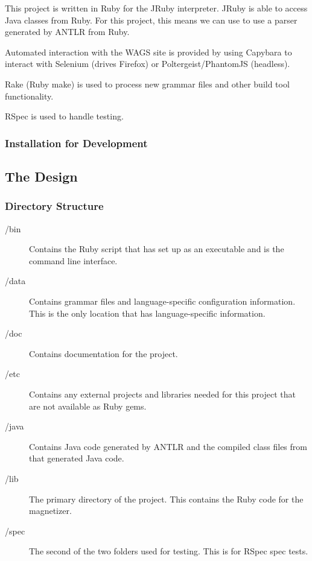 \documentclass[letter,10pt]{article}
\begin{document}

This project is written in Ruby for the JRuby interpreter. JRuby is able
to access Java classes from Ruby. For this project, this means we can 
use to use a parser generated by ANTLR from Ruby.

Automated interaction with the WAGS site is provided by using Capybara 
to interact with Selenium (drives Firefox) or Poltergeist/PhantomJS 
(headless).

Rake (Ruby make) is used to process new grammar files and other build 
tool functionality.

RSpec is used to handle testing.

\subsubsection{Installation for Development}

\subsection{The Design}

\subsubsection{Directory Structure}
\begin{description}
 \item [/bin]
    Contains the Ruby script that has set up as an 
executable and is the command line interface.

 \item [/data]
    Contains grammar files and language-specific 
configuration information. This is the only location that has 
language-specific information.

 \item [/doc]
    Contains documentation for the project.
    
 \item [/etc]
    Contains any external projects and libraries needed for this 
project that are not available as Ruby gems.

 \item [/java]
    Contains Java code generated by ANTLR and the compiled class files 
from that generated Java code.

 \item [/lib]
    The primary directory of the project. This contains the Ruby code 
for the magnetizer.

 \item [/spec]
    The second of the two folders used for testing. This is for RSpec 
spec tests.

\end{description}
\end{document}
